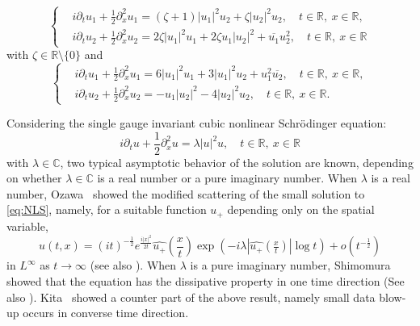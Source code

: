 \documentclass[11pt,a4paper,twosides]{amsart}
\theoremstyle{plain}
\theoremstyle{remark}
\numberwithin{equation}{section}
\newcommand{\C}{\mathbb{C}}
\newcommand{\R}{\mathbb{R}}
\theoremstyle{definition}
\newcommand{\1}{{\bf 1}_{\{|x| < |t|\}}}
\newcommand{\ol}{\overline}
\begin{document}
\begin{equation}
  \label{eq:2NLSa}
  \left\{
  \begin{aligned}
     & i\partial_t u_1 + \frac12 \partial_x^2 u_1 =
    (\zeta+1) |u_1|^2 u_2 +\zeta |u_2|^2u_2, \quad t \in \R,\ x \in \R,                                \\
     & i\partial_t u_2 + \frac12 \partial_x^2 u_2 =
    2\zeta |u_1|^2 u_1+ 2\zeta u_1 |u_2|^2 +\ol{u_1}u_2^2 ,
    \quad t \in \R,\ x \in \R                                                \end{aligned}
  \right.
\end{equation}
with $\zeta \in \R\setminus\{0\}$
and
\begin{equation}
  \label{eq:2NLSb}
  \left\{
  \begin{aligned}
     & i\partial_t u_1 + \frac12 \partial_x^2 u_1 =
    6|u_1|^2u_1 +3|u_1|^2u_2 +u_1^2\ol{u_2}, \quad t \in \R,\ x \in \R,                                \\
     & i\partial_t u_2 + \frac12 \partial_x^2 u_2 =
    -u_1|u_2|^2 - 4 |u_2|^2 u_2,
    \quad t \in \R,\ x \in \R.
    \end{aligned}
  \right.
\end{equation}


Considering the single gauge invariant cubic nonlinear Schr\"odinger equation:
\begin{equation}\label{eq:NLS}
  i\partial_t u + \frac{1}{2}\partial_x^2 u = \lambda|u|^2u, \quad t \in \R,\  x \in \R
\end{equation}
with $\lambda \in \C$, 
two typical asymptotic behavior of the solution are known, depending on whether $\lambda \in \C$ is a 
real number or a pure imaginary number. 
When $\lambda$ is a real number, Ozawa~\cite{Oz} showed the modified scattering of the small solution to \eqref{eq:NLS}, 
namely, for a suitable function $u_+$ depending only on the spatial variable, 
\begin{equation}\label{eq:msca}
  u(t,x) = (it)^{-\frac12}e^{\frac{i|x|^2}{2t}}\widehat{u_+}\left(\frac{x}{t}\right)
  \exp(-i\lambda|\widehat{u_+}(\tfrac{x}{t})|\log t) + o(t^{-\frac12})
\end{equation}
in $L^\infty$ as $t \to \infty$ 
(see also \cites{GiOz,HaNa,HaNa2,IfTa,KaPu,LS}). %
When $\lambda$ is a pure imaginary number, 
Shimomura~\cite{Shi} showed that the equation has the dissipative property in one time direction 
(See also \cite{KiSh,HaNaSu}). 
Kita~\cite{Ki} showed a counter part of the above result, namely small data blow-up occurs in converse time direction. 
\end{document}
